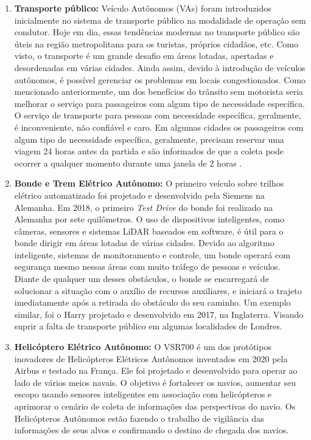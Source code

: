 \begin{enumerate}
 \item \textbf{Transporte público:} Veículo Autônomos (VAs) foram introduzidos inicialmente no sistema de transporte público na modalidade de operação sem condutor. Hoje em dia, essas tendências modernas no transporte público são úteis na região metropolitana para os turistas, próprios cidadãos, etc. Como visto, o transporte é um grande desafio em áreas lotadas, apertadas e desordenadas em várias cidades. Ainda assim, devido à introdução de veículos autônomos, é possível gerenciar os problemas em locais congestionados. Como mencionado anteriormente, um dos benefícios do trânsito sem motorista seria melhorar o serviço para passageiros com algum tipo de necessidade específica. O serviço de transporte para pessoas com necessidade específica, geralmente, é inconveniente, não confiável e caro. Em algumas cidades os passageiros com algum tipo de necessidade específica, geralmente, precisam reservar uma viagem 24 horas antes da partida e são informados de que a coleta pode ocorrer a qualquer momento durante uma janela de 2 horas \cite{notif}.
\item \textbf{Bonde e Trem Elétrico Autônomo:} O primeiro veículo sobre trilhos elétrico automatizado foi projetado e desenvolvido pela Siemens na Alemanha. Em 2018, o primeiro \textit{Test Drive} do bonde foi realizado na Alemanha por sete quilômetros. O uso de dispositivos inteligentes, como câmeras, sensores e sistemas LiDAR baseados em software, é útil para o bonde dirigir em áreas lotadas de várias cidades. Devido ao algoritmo inteligente, sistemas de monitoramento e controle, um bonde operará com segurança mesmo  nessas áreas com muito tráfego de pessoas e veículos. Diante de qualquer um desses obstáculos, o bonde se encarregará de solucionar a situação com o auxílio de recursos auxiliares, e iniciará o trajeto imediatamente após a retirada do obstáculo do seu caminho. Um exemplo similar, foi o Harry projetado e desenvolvido em 2017, na Inglaterra. Visando suprir a falta de transporte público em algumas localidades de Londres.
\item \textbf{Helicóptero Elétrico Autônomo:} O VSR700 é um dos protótipos inovadores de Helicópteros Elétricos Autônomos inventados em 2020 pela Airbus e testado na França. Ele foi projetado e desenvolvido para operar ao lado de vários meios navais. O objetivo é fortalecer os navios, aumentar seu escopo usando sensores inteligentes em associação com helicópteros e aprimorar o cenário de coleta de informações das perspectivas do navio. Os Helicópteros Autônomos estão fazendo o trabalho de vigilância das informações de seus alvos e confirmando o destino de chegada dos navios. 

\end{enumerate}
